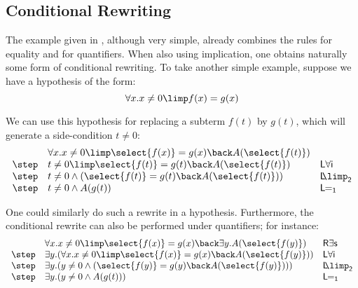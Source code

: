\subsection{Conditional Rewriting}
The example given in , although very simple,
already combines the rules for equality and for quantifiers. When also
using implication, one obtains naturally some form of conditional
rewriting. To take another simple example, suppose we have a
hypothesis of the form:
$$\forall x. x\neq 0 \limp f(x) = g(x)$$

We can use this hypothesis for replacing a subterm $f(t)$ by $g(t)$,
which will generate a side-condition $t\neq 0$:
$$
\begin{array}{lll}
  &\forall x. x\neq 0 \limp \select{f(x)} = g(x) \back A(\select{f(t)}) &\\
  \step & t\neq 0 \limp \select{f(t)} = g(t) \back A(\select{f(t)}) &\mathsf{L \forall i}\\
  \step & t\neq 0 \land (\select{f(t)} = g(t) \back A(\select{f(t)})) & \mathsf{L\!\!\limp_2}\\
  \step &  t\neq 0 \land A(g(t)) &\mathsf{L\!\!=_1} \\
\end{array}$$

One could similarly do such a rewrite in a hypothesis. Furthermore,
the conditional rewrite can also be performed under quantifiers; for instance:
$$
\begin{array}{lll}
  &\forall x. x\neq 0 \limp \select{f(x)} = g(x) \back \exists y . A(\select{f(y)})
  &\mathsf{R \exists s}\\
  \step &\exists y. ( \forall x. x\neq 0 \limp \select{f(x)} = g(x) \back A(\select{f(y)})) &\mathsf{L \forall i}\\
  \step & \exists y. ( y\neq 0 \land ( \select{f(y)} = g(y) \back A(\select{f(y)}) )) &\mathsf{L\!\!\limp_2} \\
  \step & \exists y .( y\neq 0 \land A(g(t))) &\mathsf{L\!\!=_1} \\
\end{array}$$



